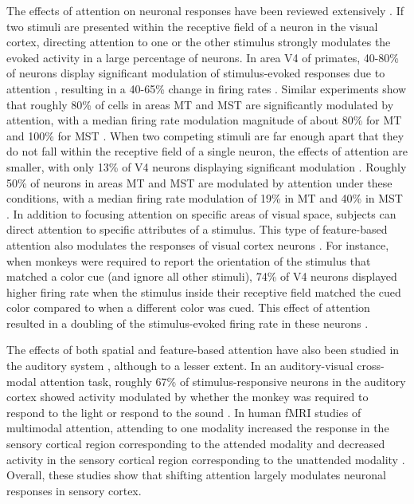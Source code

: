 The effects of attention on neuronal responses have been reviewed extensively \citep{Treue2001, Maunsell2002, Reynolds2004}. If two stimuli are presented within the receptive field of a neuron in the visual cortex, directing attention to one or the other stimulus strongly modulates the evoked activity in a large percentage of neurons. In area V4 of primates, 40-80\% of neurons display significant modulation of stimulus-evoked responses due to attention \citep{Motter1993, Luck1997, Reynolds1999, McAdams1999}, resulting in a 40-65\% change in firing rates \citep{Luck1997, McAdams1999}. Similar experiments show that roughly 80\% of cells in areas MT and MST are significantly modulated by attention, with a median firing rate modulation magnitude of about 80\% for MT and 100\% for MST \citep{Treue1996, Treue1999}. When two competing stimuli are far enough apart that they do not fall within the receptive field of a single neuron, the effects of attention are smaller, with only 13\% of V4 neurons displaying significant modulation \citep{Luck1997}. Roughly 50\% of neurons in areas MT and MST are modulated by attention under these conditions, with a median firing rate modulation of 19\% in MT and 40\% in MST \citep{Treue1996}. In addition to focusing attention on specific areas of visual space, subjects can direct attention to specific attributes of a stimulus. This type of feature-based attention also modulates the responses of visual cortex neurons \citep[reviewed in][]{Maunsell2006}. For instance, when monkeys were required to report the orientation of the stimulus that matched a color cue (and ignore all other stimuli), 74\% of V4 neurons displayed higher firing rate when the stimulus inside their receptive field matched the cued color compared to when a different color was cued. This effect of attention resulted in a doubling of the stimulus-evoked firing rate in these neurons \citep{Motter1994a}.

The effects of both spatial and feature-based attention have also been studied in the auditory system \citep{Fritz2007b, Hromadka2007}, although to a lesser extent. In an auditory-visual cross-modal attention task, roughly 67\% of stimulus-responsive neurons in the auditory cortex showed activity modulated by whether the monkey was required to respond to the light or respond to the sound \citep{Hocherman1976}. In human fMRI studies of multimodal attention, attending to one modality increased the response in the sensory cortical region corresponding to the attended modality and decreased activity in the sensory cortical region corresponding to the unattended modality \citep{Johnson2005}. Overall, these studies show that shifting attention largely modulates neuronal responses in sensory cortex.

